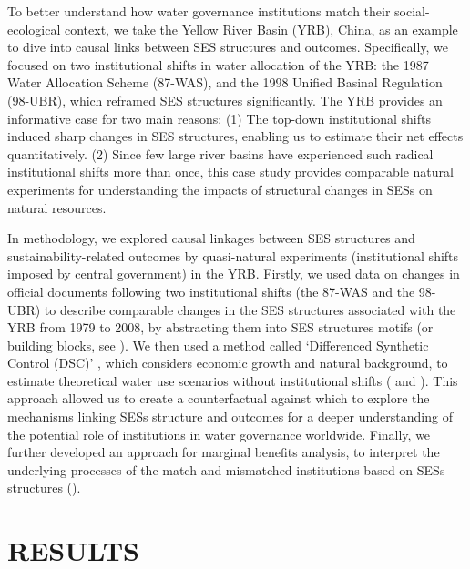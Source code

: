 \documentclass[default, sn-standardnature]{sn-jnl}
\begin{document}
To better understand how water governance institutions match their social-ecological context, we take the Yellow River Basin (YRB), China, as an example \textit{} to dive into causal links between SES structures and outcomes.
Specifically, we focused on two institutional shifts in water allocation of the YRB: the 1987 Water Allocation Scheme (87-WAS), and the 1998 Unified Basinal Regulation (98-UBR), which reframed SES structures significantly.
The YRB provides an informative case for two main reasons:
(1) The top-down institutional shifts induced sharp changes in SES structures, enabling us to estimate their net effects quantitatively.
(2) Since few large river basins have experienced such radical institutional shifts more than once, this case study provides comparable natural experiments for understanding the impacts of structural changes in SESs on natural resources.

In methodology, we explored causal linkages between SES structures and sustainability-related outcomes by quasi-natural experiments (institutional shifts imposed by central government) in the YRB.
Firstly, we used data on changes in official documents following two institutional shifts (the 87-WAS and the 98-UBR) to describe comparable changes in the SES structures associated with the YRB from 1979 to 2008, by abstracting them into SES structures motifs (or building blocks, see \textit{}).
We then used a method called `Differenced Synthetic Control (DSC)' \cite{arkhangelsky2021}, which considers economic growth and natural background, to estimate theoretical water use scenarios without institutional shifts (\textit{} and \textit{}).
This approach allowed us to create a counterfactual against which to explore the mechanisms linking SESs structure and outcomes for a deeper understanding of the potential role of institutions in water governance worldwide.
Finally, we further developed an approach for marginal benefits analysis, to interpret the underlying processes of the match and mismatched institutions based on SESs structures (\textit{}).


\section{RESULTS}\label{sec:results}

\end{document}
